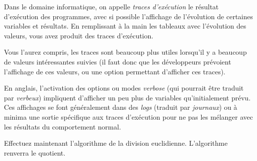 \documentclass[11pt,a4paper]{article}
\begin{document}
%

\bigskip


Dans le domaine informatique, on appelle \textit{traces d'exécution} le résultat d'exécution des programmes, avec si possible l'affichage de l'évolution de certaines variables et résultats.
En remplissant à la main les tableaux avec l'évolution des valeurs, vous avez produit des traces d'exécution.

Vous l'aurez compris, les traces sont beaucoup plus utiles lorsqu'il y a beaucoup de valeurs intéressantes suivies (il faut donc que les développeurs prévoient l'affichage de ces valeurs, ou une option permettant d'afficher ces traces).

En anglais, l'activation des options ou modes \textit{verbose} (qui pourrait être traduit par \textit{verbeux}) impliquent d'afficher un peu plus de variables qu'initialement prévu.
Ces affichages se font généralement dans des \textit{logs} (traduit par \textit{journaux}) ou à minima une sortie spécifique aux traces d'exécution pour ne pas les mélanger avec les résultats du comportement normal.


\vfillLast

\newpage

\vfillFirst


Effectuez maintenant l'algorithme de la division euclidienne.
L'algorithme renverra le quotient.


\bigskip
\end{document}
